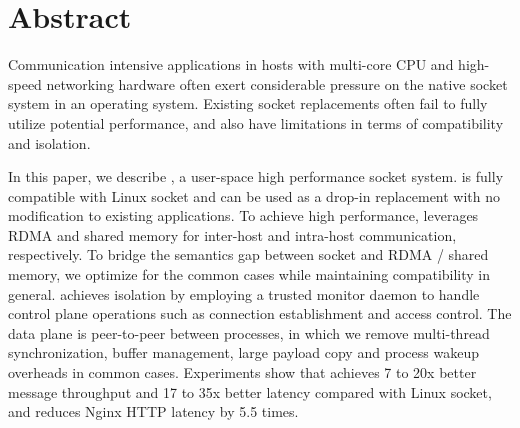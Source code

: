 \section*{Abstract}

Communication intensive applications in hosts with multi-core CPU and high-speed networking hardware often exert considerable pressure on the native socket system in an operating system. Existing socket replacements often fail to fully utilize potential performance, and also have limitations in terms of compatibility and isolation. 


In this paper, we describe \sys, a user-space high performance socket system.
\sys is fully compatible with Linux socket and can be used as a drop-in replacement with no modification to existing applications.
To achieve high performance, \sys{} leverages RDMA and shared memory for inter-host and intra-host communication, respectively.
To bridge the semantics gap between socket and RDMA / shared memory, we optimize for the common cases while maintaining compatibility in general.
\sys achieves isolation by employing a trusted monitor daemon to handle control plane operations such as connection establishment and access control.
The data plane is peer-to-peer between processes, in which we remove multi-thread synchronization, buffer management, large payload copy and process wakeup overheads in common cases.
Experiments show that \sys achieves 7 to 20x better message throughput and 17 to 35x better latency compared with Linux socket, and reduces Nginx HTTP latency by 5.5 times.
